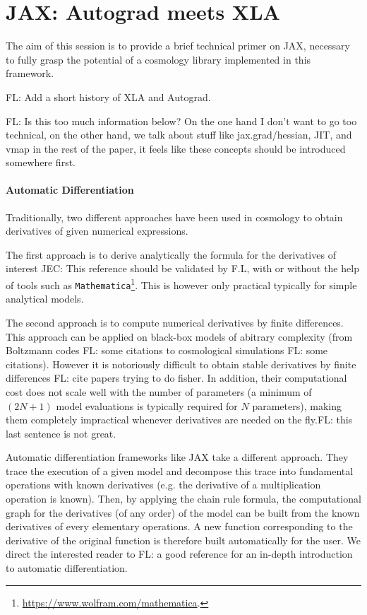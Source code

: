 \documentclass[twocolumn,twocolappendix,nofootinbib,iop]{openjournal}
\newcommand{\FrL}[1]{{\color{cyan}FL: #1}}
\newcommand{\JEC}[1]{{\color{magenta}JEC: #1}}
\begin{document}
\section{JAX: Autograd meets XLA}
\label{sec-primer}

The aim of this session is to provide a brief technical primer on JAX, necessary to fully grasp the potential of a cosmology library implemented in this framework.

\FrL{Add a short history of XLA and Autograd.}


\FrL{Is this too much information below? On the one hand I don't want to go too technical, on the other hand, we talk about stuff like jax.grad/hessian, JIT, and vmap in the rest of the paper, it feels like these concepts should be introduced somewhere first.}

\paragraph{Automatic Differentiation} Traditionally, two different approaches have been used in cosmology to obtain derivatives of given numerical expressions.

The first approach is to derive analytically the formula for the derivatives of interest \citep{2019A&A...625A..64J} \JEC{This reference should be validated by F.L}, with or without the help of tools such as \texttt{Mathematica}\footnote{\url{https://www.wolfram.com/mathematica}.}. This is however only practical typically for simple analytical models.

The second approach is to compute numerical derivatives by finite differences. This approach can be applied on black-box models of abitrary complexity (from Boltzmann codes \FrL{some citations} to cosmological simulations \FrL{some citations}). However it is notoriously difficult to obtain stable derivatives by finite differences \FrL{cite papers trying to do fisher}. In addition, their computational cost does not scale well with the number of parameters (a minimum of $(2N+1)$ model evaluations is typically required for $N$ parameters), making them completely impractical whenever derivatives are needed on the fly.\FrL{this last sentence is not great.}

Automatic differentiation frameworks like JAX take a different approach. They trace the execution of a given model and decompose this trace into fundamental operations with known derivatives (e.g. the derivative of a multiplication operation is known). Then, by applying the chain rule formula, the computational graph for the derivatives (of any order) of the model can be built from the known derivatives of every elementary operations. A new function corresponding to the derivative of the original function is therefore built automatically for the user. We direct the interested reader to \FrL{a good reference} for an in-depth introduction to automatic differentiation. 
\end{document}
